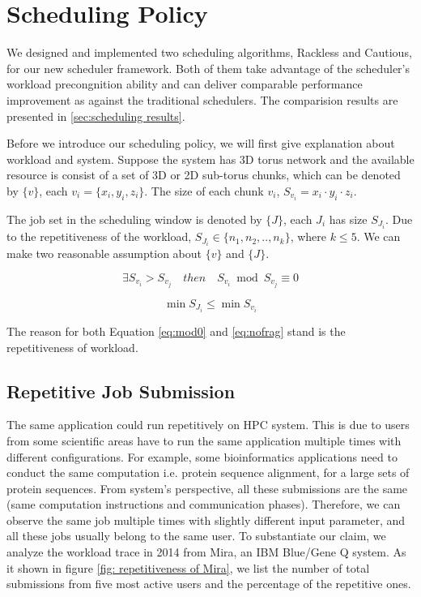 \documentclass[conference]{IEEEtran}
\begin{document}
\section{Scheduling Policy}
\label{sec:scheduling policy}

We designed and implemented two scheduling algorithms, Rackless and Cautious, for our new scheduler framework. Both of them take advantage of the scheduler's workload precongnition ability and can deliver comparable performance improvement 
as against the traditional schedulers. The comparision results are presented in \ref{sec:scheduling results}.


Before we introduce our scheduling policy, we will first give explanation about workload and system. Suppose the system has 3D torus network and the available resource is consist of a set of 3D or 2D sub-torus chunks, which can be denoted by $\{v\}$, each $v_i = \{x_i, y_i, z_i\}$. The size of each chunk $v_i$, $S_{v_i} = x_i\cdot y_i\cdot z_i $. 

The job set in the scheduling window is denoted by $\{J\}$, each $J_i$ has size $S_{J_i}$. Due to the repetitiveness of the workload, $S_{J_i} \in \{n_1, n_2, .., n_k\}$, where $k \leq 5$. 
We can make two reasonable assumption about $\{v\}$ and $\{J\}$. 

\begin{equation}
\label{eq:mod0}
\exists S_{v_i} > S_{v_j} \quad then\quad S_{v_i} \bmod S_{v_j} \equiv 0
\end{equation}


\begin{equation}
\label{eq:nofrag}
\min S_{J_i} \leq \min S_{v_i} 
\end{equation}

The reason for both Equation \ref{eq:mod0} and \ref{eq:nofrag} stand is the repetitiveness of workload.


\subsection{Repetitive Job Submission}
\label{sec: repetitive job submission}

The same application could run repetitively on HPC system. This is due to users from some scientific areas have to run the same application multiple times with different configurations. For example, some bioinformatics applications need to conduct the same computation i.e. protein sequence alignment, for a large sets of protein sequences. From system's perspective, all these submissions are the same (same computation instructions and communication phases). Therefore, we can observe the same job multiple times with slightly different input parameter, and all these jobs usually belong to the same user. To substantiate our claim, we analyze the workload trace in 2014 from Mira, an IBM Blue/Gene Q system. As it shown in figure \ref{fig: repetitiveness of Mira},  we list the number of total submissions from five most active users and the percentage of the repetitive ones.
\end{document}
